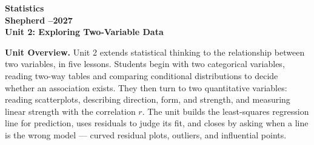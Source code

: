 \documentclass[10pt]{article}
\begin{document}
\vspace{-1.3in}

\begin{center}
  {\color{white}\bfseries\fontsize{28}{34}\selectfont Statistics}\\[8pt]
  {\color{goldacc}\bfseries\Large Shepherd --2027}\\[14pt]
  {\color{white}\bfseries\LARGE Unit 2: Exploring Two-Variable Data}\\[4pt]
\end{center}

\vspace{0.30in}

\begin{tcolorbox}[colback=sky,colframe=navy,boxrule=0.9pt,arc=2mm,
    left=4mm,right=4mm,top=3mm,bottom=3mm]
  \textbf{Unit Overview.}\quad
  Unit 2 extends statistical thinking to the relationship between two variables, in
  five lessons. Students begin with two categorical variables, reading two-way tables and
  comparing conditional distributions to decide whether an association exists. They then
  turn to two quantitative variables: reading scatterplots, describing direction, form,
  and strength, and measuring linear strength with the correlation $r$. The unit builds the
  least-squares regression line for prediction, uses residuals to judge its fit, and closes
  by asking when a line is the wrong model --- curved residual plots, outliers, and
  influential points.
\end{tcolorbox}

\vspace{0.22in}
\end{document}
